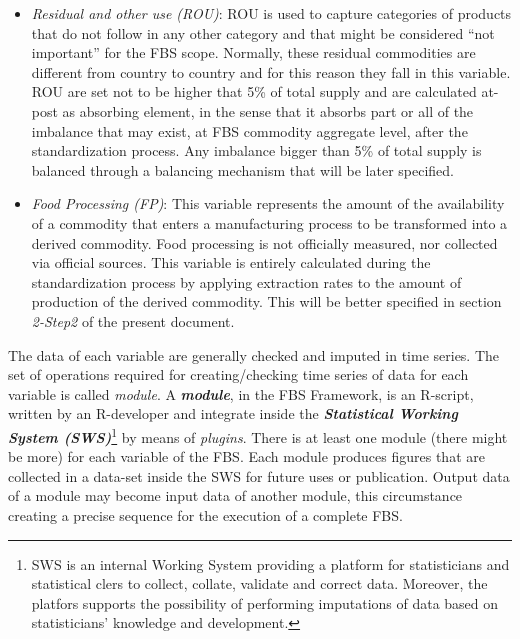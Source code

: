 \documentclass[]{article}
\let\rmarkdownfootnote\footnote%
\def\footnote{\protect\rmarkdownfootnote}
\begin{document}
\begin{itemize}
  international organizations and so on. The missing data are imputed
  using a hierarchical model based on commodity groups\footnote{ask for
    links to a proper documentation}.
\item
  \emph{Residual and other use (ROU)}: ROU is used to capture categories
  of products that do not follow in any other category and that might be
  considered ``not important'' for the FBS scope. Normally, these
  residual commodities are different from country to country and for
  this reason they fall in this variable. ROU are set not to be higher
  that 5\% of total supply and are calculated at-post as absorbing
  element, in the sense that it absorbs part or all of the imbalance
  that may exist, at FBS commodity aggregate level, after the
  standardization process. Any imbalance bigger than 5\% of total supply
  is balanced through a balancing mechanism that will be later
  specified.
\item
  \emph{Food Processing (FP)}: This variable represents the amount of
  the availability of a commodity that enters a manufacturing process to
  be transformed into a derived commodity. Food processing is not
  officially measured, nor collected via official sources. This variable
  is entirely calculated during the standardization process by applying
  extraction rates to the amount of production of the derived commodity.
  This will be better specified in section \emph{2-Step2} of the present
  document.
\end{itemize}

The data of each variable are generally checked and imputed in time
series. The set of operations required for creating/checking time series
of data for each variable is called \emph{module}. A
\textbf{\emph{module}}, in the FBS Framework, is an R-script, written by
an R-developer and integrate inside the \textbf{\emph{Statistical
Working System (SWS)}}\footnote{SWS is an internal Working System
  providing a platform for statisticians and statistical clers to
  collect, collate, validate and correct data. Moreover, the platfors
  supports the possibility of performing imputations of data based on
  statisticians' knowledge and development.} by means of \emph{plugins}.
There is at least one module (there might be more) for each variable of
the FBS. Each module produces figures that are collected in a data-set
inside the SWS for future uses or publication. Output data of a module
may become input data of another module, this circumstance creating a
precise sequence for the execution of a complete FBS.
\end{document}
